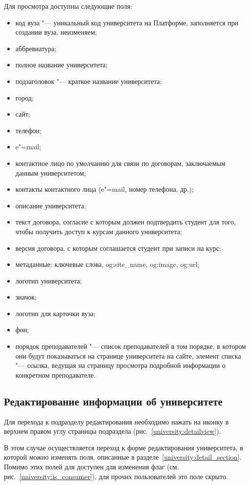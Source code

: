 	Для просмотра доступны следующие поля:
	\begin{itemize}
		\item код вуза "--- уникальный код университета на Платформе, заполняется при создании вуза, неизменяем;
		\item аббревиатура;
		\item полное название университета;
		\item подзаголовок "--- краткое название университета;
		\item город;
		\item сайт;
		\item телефон;
		\item e"=mail;
		\item контактное лицо по умолчанию для связи по договорам, заключаемым данным университетом;
		\item контакты контактного лица (e"=mail, номер телефона, др.);
		\item описание университета;
		\item текст договора, согласие с которым должен подтвердить студент для того, чтобы получить доступ к курсам данного университета;
		\item версия договора, с которым соглашается студент при записи на курс;
		\item метаданные: ключевые слова, og:site\_name, og:image, og:url;
		\item логотип университета;
		\item значок;
		\item логотип для карточки вуза;
		\item фон;
		\item порядок преподавателей "--- список преподавателей в том порядке, в котором они будут показываться на странице университета на сайте, элемент списка "--- ссылка, ведущая на страницу просмотра подробной информации о конкретном преподавателе.
	\end{itemize}

	\subsection{Редактирование информации об университете}\label{university:edit}
	Для перехода к подразделу редактирования необходимо нажать на иконку  в верхнем правом углу страницы подраздела  (рис.~\ref{university:detailview}).

	
	В этом случае осуществляется переход к форме редактирования университета, в которой можно изменять поля, описанные в разделе~\ref{university:detail_section}. 
	Помимо этих полей для  доступен для изменения флаг  (см. рис.~\ref{university:is_consumer}), для прочих пользователей это поле скрыто.
	
